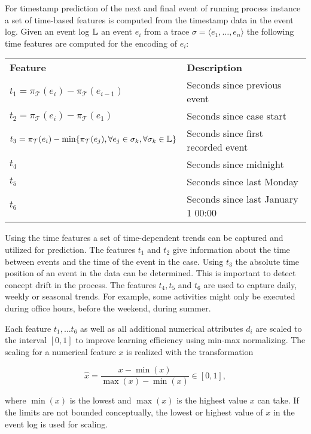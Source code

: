 For timestamp prediction of the next and final event of running process instance a set of time-based features is computed from the timestamp data in the event log.
Given an event log $\mathbb{L}$ an event $e_i$ from a trace $\sigma = \langle e_1, \dots, e_n \rangle$ the following time features are computed for the encoding of $e_i$: 

\begin{center}
\begin{tabularx}{\textwidth}{l l}
	\centering
	 \textbf{Feature} & \textbf{Description} \\
	$t_1 = \pi_\mathcal{T}(e_i) - \pi_\mathcal{T}(e_{i-1})$ & Seconds since previous event \\
	$t_2 = \pi_\mathcal{T}(e_i) - \pi_\mathcal{T}(e_1)$ & Seconds since case start \\
	$t_3 = \pi_\mathcal{T}(e_i) - \min\{\pi_\mathcal{T}(e_{j}), \forall e_j \in \sigma_k, \forall  \sigma_k \in \mathbb{L}\}$ & Seconds since first recorded event \\
	$t_4$ & Seconds since midnight \\
	$t_5$ & Seconds since last Monday \\
	$t_6$ & Seconds since last January 1 00:00
\end{tabularx}
\end{center}

Using the time features a set of time-dependent trends can be captured and utilized for prediction.
The features $t_1$ and $t_2$ give information about the time between events and the time of the event in the case.
Using $t_3$ the absolute time position of an event in the data can be determined.
This is important to detect concept drift in the process.
The features $t_4, t_5$ and $t_6$ are used to capture daily, weekly or seasonal trends.
For example, some activities might only be executed during office hours, before the weekend, during summer.

Each feature $t_1, \dots t_6$ as well as all additional numerical attributes $d_i$ are scaled to the interval $ [0, 1]$ to improve learning efficiency using min-max normalizing.
The scaling for a numerical feature $x$ is realized with the transformation

$$\hat{x} = \dfrac{x-\min(x)}{\max(x) - \min(x)} \in [0, 1],$$

where $\min(x)$ is the lowest and $\max(x)$ is the highest value $x$ can take.
If the limits are not bounded conceptually, the lowest or highest value of $x$ in the event log is used for scaling.

